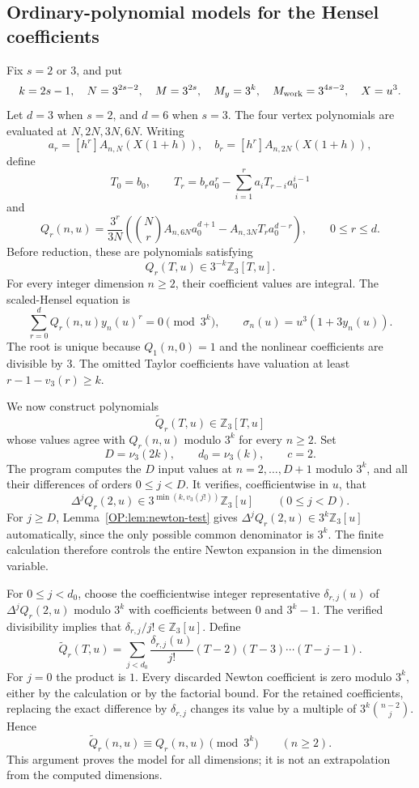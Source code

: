 \documentclass[11pt,a4paper]{article}
\theoremstyle{definition}\newtheorem{definition}[theorem]{Definition}
\theoremstyle{remark}\newtheorem{remark}[theorem]{Remark}
\numberwithin{equation}{section}
\begin{document}
\subsection{Ordinary-polynomial models for the Hensel coefficients}
Fix $s=2$ or $3$, and put
\[
 k=2s-1,\quad N=3^{2s-2},\quad M=3^{2s},\quad
 M_y=3^k,\quad M_{\rm work}=3^{4s-2},\quad X=u^3.
\]
Let $d=3$ when $s=2$, and $d=6$ when $s=3$.
The four vertex polynomials are evaluated at $N,2N,3N,6N$.
Writing
\[
 a_r=[h^r]A_{n,N}(X(1+h)),\quad
 b_r=[h^r]A_{n,2N}(X(1+h)),
\]
define
\[
 T_0=b_0,\qquad
 T_r=b_ra_0^r-\sum_{i=1}^r a_iT_{r-i}a_0^{i-1}
\]
and
\[
 Q_r(n,u)=\frac{3^r}{3N}
 \left(\binom Nr A_{n,6N}a_0^{d+1}
       -A_{n,3N}T_ra_0^{d-r}\right),\qquad0\leq r\leq d.
\]
Before reduction, these are polynomials satisfying
\[
 Q_r(T,u)\in3^{-k}\mathbb Z_3[T,u].
\]
For every integer dimension $n\geq2$, their coefficient values are
integral.  The scaled-Hensel equation is
\[
 \sum_{r=0}^dQ_r(n,u)y_n(u)^r=0\pmod{3^k},\qquad
 \sigma_n(u)=u^3(1+3y_n(u)).
\]
The root is unique because $Q_1(n,0)=1$ and the nonlinear coefficients
are divisible by $3$.  The omitted Taylor coefficients have valuation
at least $r-1-v_3(r)\geq k$.

We now construct polynomials
\[
 \widetilde Q_r(T,u)\in\mathbb Z_3[T,u]
\]
whose values agree with $Q_r(n,u)$ modulo $3^k$ for every $n\geq2$.
Set
\[
 D=\nu_3(2k),\qquad d_0=\nu_3(k),\qquad c=2.
\]
The program computes the $D$ input values at $n=2,\ldots,D+1$ modulo
$3^k$, and all their differences of orders $0\leq j<D$.  It verifies,
coefficientwise in $u$, that
\begin{equation}\label{OP:eq:newton-integrality-check}
 \Delta^j Q_r(2,u)\in
 3^{\min(k,v_3(j!))}\mathbb Z_3[u]
 \qquad(0\leq j<D).
\end{equation}
For $j\geq D$, Lemma~\ref{OP:lem:newton-test} gives
$\Delta^jQ_r(2,u)\in3^k\mathbb Z_3[u]$ automatically, since the only
possible common denominator is $3^k$.  The finite calculation therefore
controls the entire Newton expansion in the dimension variable.

For $0\leq j<d_0$, choose the coefficientwise integer representative
$\delta_{r,j}(u)$ of $\Delta^jQ_r(2,u)$ modulo $3^k$ with coefficients
between $0$ and $3^k-1$.  The verified divisibility implies that
$\delta_{r,j}/j!\in\mathbb Z_3[u]$.  Define
\[
 \widetilde Q_r(T,u)=
 \sum_{j<d_0}\frac{\delta_{r,j}(u)}{j!}
                (T-2)(T-3)\cdots(T-j-1).
\]
For $j=0$ the product is $1$.  Every discarded Newton coefficient is
zero modulo $3^k$, either by the calculation or by the factorial bound.
For the retained coefficients, replacing the exact difference by
$\delta_{r,j}$ changes its value by a multiple of $3^k\binom{n-2}{j}$.
Hence
\[
 \widetilde Q_r(n,u)\equiv Q_r(n,u)\pmod{3^k}
 \qquad(n\geq2).
\]
This argument proves the model for all dimensions; it is not an
extrapolation from the computed dimensions.
\end{document}
